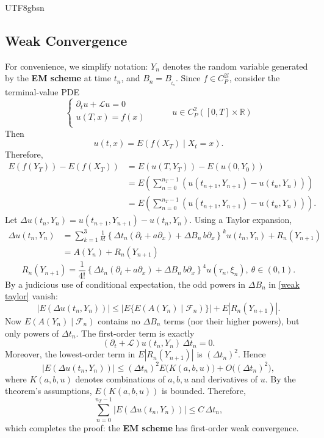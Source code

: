 \documentclass{article}
\begin{document}
\begin{CJK*}{UTF8}{gbsn}
\subsection{Weak Convergence\label{B2}}
For convenience, we simplify notation: $Y_n$ denotes the random variable generated by the \textbf{EM scheme} at time $t_{n}$, and $B_n=B_{_{t_n}}$.
Since $f\in C_P^{2l}$, consider the terminal-value PDE
$$
\begin{cases}
        \partial_tu+\mathcal{L}u=0&\\
        u(T,x)=f(x)&\\
    \end{cases}
    \qquad u\in C^2_P([0,T]\times\mathbb{R}\label{diffeq})
$$
Then
$$
u(t,x)=E(f(X_T)\mid X_t=x).
$$
Therefore,
$$
\begin{aligned}
E(f(Y_{T}))-E(f(X_T))
&=E(u(T,Y_T))-E(u(0,Y_0))\\
&= E \left( \sum_{n=0}^{n_T-1} \left( u(t_{n+1}, Y_{n+1}) - u(t_n, Y_{n}) \right) \right)\\
&= E \left( \sum_{n=0}^{n_T-1} \left( u(t_{n+1}, Y_{n+1}) - u(t_n, Y_{n}) \right) \right).
\end{aligned}
$$
Let $\Delta u(t_n,Y_n)= u(t_{n+1}, Y_{n+1}) - u(t_{n}, Y_{n})$.
Using a Taylor expansion,
\begin{equation}\begin{aligned}
\Delta u(t_n,Y_n)
&=\sum_{k=1}^3\frac{1}{k!}\left\{\Delta t_n(\partial_t+a\partial_x)+\Delta B_n\,b\partial_x\right\}^k u(t_n,Y_n)+R_n(Y_{n+1})\\
&=A(Y_n)+R_n(Y_{n+1})
\label{weak taylor}
\end{aligned}\end{equation}
$$
R_n(Y_{n+1})=\frac{1}{4!}\left\{\Delta t_n(\partial_t+a\partial_x)+\Delta B_n\,b\partial_x\right\}^4u(\tau_n,\xi_n),\ \theta\in(0,1).
$$
By a judicious use of conditional expectation, the odd powers in $\Delta B_n$ in \ref{weak taylor} vanish:
$$
|E(\Delta u(t_n,Y_n))|
\le
\big|E\{E(A(Y_n)\mid\mathcal{F}_n)\}\big|+E|R_n(Y_{n+1})|.
$$
Now $E(A(Y_n)\mid\mathcal{F}_n)$ contains no $\Delta B_n$ terms (nor their higher powers), but only powers of $\Delta t_n$. The first-order term is exactly
$$
(\partial_t+\mathcal{L})u(t_n,Y_n)\,\Delta t_n=0.
$$
Moreover, the lowest-order term in $E|R_n(Y_{n+1})|$ is $(\Delta t_n)^2$. Hence
$$
|E(\Delta u(t_n,Y_n))|\le(\Delta t_n)^2 E\!\big(K(a,b,u)\big)+O\!\big((\Delta t_n)^2\big),
$$
where $K(a,b,u)$ denotes combinations of $a,b,u$ and derivatives of $u$. By the theorem’s assumptions, $E(K(a,b,u))$ is bounded. Therefore,
$$
\sum_{n=0}^{n_T-1}|E(\Delta u(t_n,Y_n))|\le C\,\Delta t_n,
$$
which completes the proof: the \textbf{EM scheme} has first-order weak convergence.


\end{CJK*}
\end{document}
